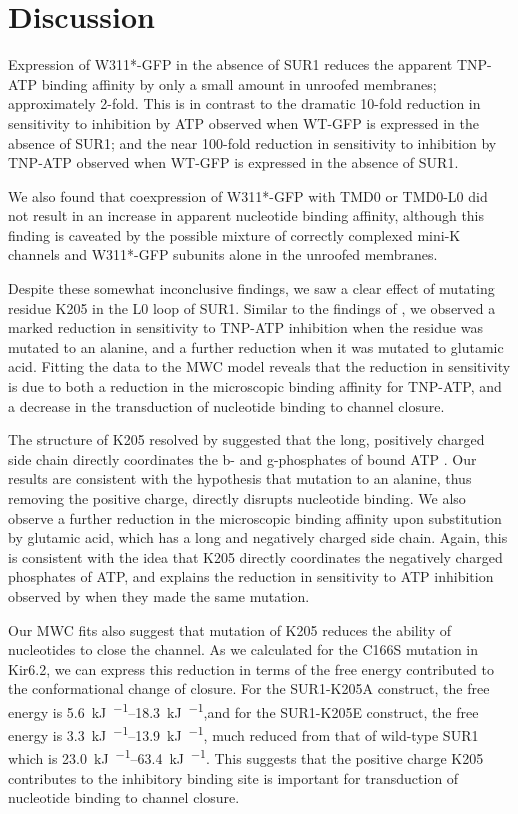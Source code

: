 \section{Discussion}

Expression of W311*-GFP in the absence of SUR1 reduces the apparent TNP-ATP binding affinity by only a small amount in unroofed membranes; approximately 2-fold.
This is in contrast to the dramatic 10-fold reduction in sensitivity to inhibition by ATP observed when WT-GFP is expressed in the absence of SUR1; and the near 100-fold reduction in sensitivity to inhibition by TNP-ATP observed when WT-GFP is expressed in the absence of SUR1.


We also found that coexpression of W311*-GFP with TMD0 or TMD0-L0 did not result in an increase in apparent nucleotide binding affinity, although this finding is caveated by the possible mixture of correctly complexed mini-K\ATP{} channels and W311*-GFP subunits alone in the unroofed membranes.

Despite these somewhat inconclusive findings, we saw a clear effect of mutating residue K205 in the L0 loop of SUR1.
Similar to the findings of \textcite{ding_structural_2019}, we observed a marked reduction in sensitivity to TNP-ATP inhibition when the residue was mutated to an alanine, and a further reduction when it was mutated to glutamic acid.
Fitting the data to the MWC model reveals that the reduction in sensitivity is due to both a reduction in the microscopic binding affinity for TNP-ATP, and a decrease in the transduction of nucleotide binding to channel closure.

The structure of K205 resolved by \textcite{ding_structural_2019} suggested that the long, positively charged side chain directly coordinates the \textgreek{b}- and \textgreek{g}-phosphates of bound ATP \cite{ding_structural_2019}.
Our results are consistent with the hypothesis that mutation to an alanine, thus removing the positive charge, directly disrupts nucleotide binding.
We also observe a further reduction in the microscopic binding affinity upon substitution by glutamic acid, which has a long and negatively charged side chain.
Again, this is consistent with the idea that K205 directly coordinates the negatively charged phosphates of ATP, and explains the reduction in sensitivity to ATP inhibition observed by \textcite{pratt_engineered_2012} when they made the same mutation.

Our MWC fits also suggest that mutation of K205 reduces the ability of nucleotides to close the channel.
As we calculated for the C166S mutation in Kir6.2, we can express this reduction in terms of the free energy contributed to the conformational change of closure.
For the SUR1-K205A construct, the free energy is \SIrange{5.6}{18.3}{\kilo\joule\per\Molar},and for the SUR1-K205E construct, the free energy is \SIrange{3.3}{13.9}{\kilo\joule\per\Molar}, much reduced from that of wild-type SUR1 which is \SIrange{23.0}{63.4}{\kilo\joule\per\Molar}.
This suggests that the positive charge K205 contributes to the inhibitory binding site is important for transduction of nucleotide binding to channel closure.

